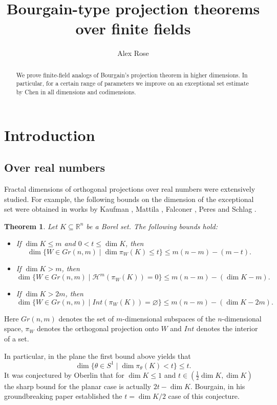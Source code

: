 \documentclass{amsart}
\title{Bourgain-type projection theorems over finite fields}
\author{Alex Rose}
\date{}
\newtheorem{theorem}{Theorem}[section]
\begin{document}
\begin{abstract}
We prove finite-field analogs of Bourgain's projection theorem in higher dimensions. In particular, for a certain range of parameters we improve on an exceptional set estimate by Chen in all dimensions and codimensions.
\end{abstract}

\maketitle

\section{Introduction}
\subsection{Over real numbers}
Fractal dimensions of orthogonal projections over real numbers were extensively studied. For example, the following bounds on the dimension of the exceptional set were obtained in works by Kaufman \cite{Kau68}, Mattila \cite{Mat75}, Falconer \cite{Fal82}, Peres and Schlag \cite{Per00}.

\begin{theorem}\label{Kaufman}
    Let $K \subseteq \mathbb{R}^n$ be a Borel set. The following bounds hold: 
    \begin{itemize}
        \item If $\dim K \leq m$ and $0 < t \leq \dim K$, then 
        $$ \dim\{W \in Gr(n, m) \mid \dim \pi_W(K) \leq t\} \leq m(n - m) - (m - t).$$
        \item If $\dim K > m$, then 
        $$ \dim\{W \in Gr(n, m) \mid \mathcal{H}^m(\pi_W(K)) = 0\} \leq m(n - m) - (\dim K - m).$$
        \item If $\dim K > 2m$, then
        $$ \dim\{W \in Gr(n, m) \mid Int(\pi_W(K)) = \varnothing\} \leq m(n - m) - (\dim K - 2m).$$
    \end{itemize}
\end{theorem}

Here $Gr(n, m)$ denotes the set of $m$-dimensional subspaces of the $n$-dimensional space, $\pi_W$ denotes the orthogonal projection onto $W$ and $Int$ denotes the interior of a set.

In particular, in the plane the first bound above yields that $$\dim\{ \theta \in S^1 \mid \dim \pi_\theta(K) < t\} \leq t.$$ It was conjectured by Oberlin \cite{Obe12} that for $\dim K \leq 1$ and $t \in (\frac{1}{2} \dim K, \dim K)$ the sharp bound for the planar case is actually $2t - \dim K$. Bourgain, in his groundbreaking paper \cite{Bou10} established the $t = \dim K/2$ case of this conjecture.
\end{document}
